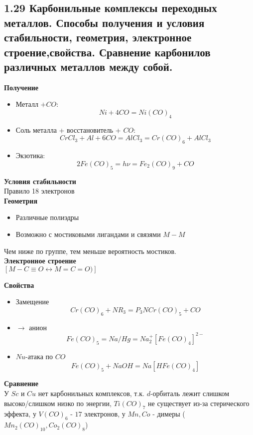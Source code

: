 

\subsection{1.29 Карбонильные комплексы переходных металлов. Способы получения и условия стабильности, геометрия, электронное строение,свойства. Сравнение карбонилов различных металлов между собой.}
\textbf{Получение}\\
\begin{itemize}
	\item Металл $+ CO$:
	\[
	Ni + 4CO = Ni(CO)_4
	\]
	\item Соль металла + восстановитель + $CO$:
	\[
	CrCl_3 + Al + 6CO = AlCl_3 = Cr(CO)_6 + AlCl_3
	\]
	\item Экзотика: 
	\[
	2Fe(CO)_5 = h\nu = Fe_2(CO)_9 + CO
	\]
\end{itemize}
\textbf{Условия стабильности}\\
Правило 18 электронов \\
\textbf{Геометрия}\\
\begin{figure} [H]
	\centering {\texttt{[image: dd2]}}
\end{figure}
\begin{itemize}
	\item Различные полиэдры
	\item Возможно с мостиковыми лигандами и связями $M-M$
\end{itemize}
\begin{figure} [H]
	\centering {\texttt{[image: dd3]}}
\end{figure}
Чем ниже по группе, тем меньше вероятность мостиков. \\
\textbf{Электронное строение}\\
$\left[ M-C\equiv O \leftrightarrow M = C = O ) \right]$ \\
\begin{figure} [H]
	\centering {\texttt{[image: dd4]}}
\end{figure}
\textbf{Свойства}\\
\begin{itemize}
	\item Замещение
	\[
	Cr(CO)_6 + NR_3 = P_3NCr(CO)_5 + CO
	\]
	\item $\rightarrow $ анион
	\[
	Fe(CO)_5 = Na/Hg = Na_2^{+} \left[Fe(CO)_4 \right]^{2-}
 	\]
	\item $Nu$-атака по $CO$
	\[
	Fe(CO)_5 + NaOH = Na \left[ HFe(CO)_4 \right]
	\]
\end{itemize}
\textbf{Сравнение}\\
У $Sc$ и $Cu$ нет карбонильных комплексов, т.к. $d$-орбиталь лежит слишком высоко/слишком низко по энергии, $Ti(CO)_7$ не существует из-за стерического эффекта, у $V(CO)_6$ - $17$ электронов, у $Mn, Co$ - димеры ($Mn_2(CO)_{10}, Co_2(CO)_8$) 


